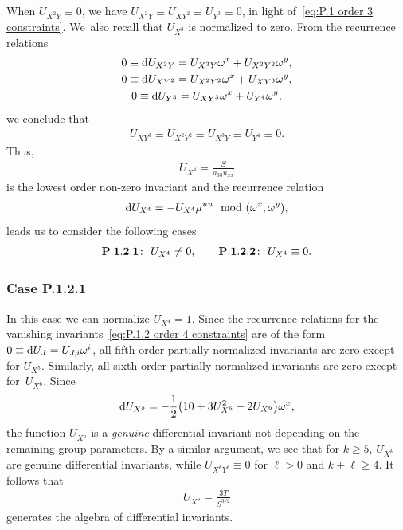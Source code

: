 \documentclass[10pt,a4paper]{amsart}
\numberwithin{equation}{section}
\begin{document}
When $U_{X^2Y}\equiv 0$, we have $U_{X^2Y}\equiv U_{XY^2}\equiv U_{Y^3}\equiv0$, in light of~\eqref{eq:P.1 order 3 constraints}. We~also recall that $U_{X^3}$ is normalized to zero. From the recurrence relations
%
\begin{gather*}
0 \equiv {\rm d}U_{X^2Y} = U_{X^3Y}\omega^x + U_{X^2Y^2}\omega^y, \\
0 \equiv {\rm d}U_{XY^2} = U_{X^2Y^2}\omega^x + U_{XY^3}\omega^y, \\
0 \equiv {\rm d}U_{Y^3} = U_{XY^3}\omega^x + U_{Y^4}\omega^y,
\end{gather*}
%
we conclude that
%
\begin{gather}\label{eq:P.1.2 order 4 constraints}
U_{XY^3} \equiv U_{X^2Y^2}\equiv U_{X^3Y}\equiv U_{Y^4} \equiv 0.
\end{gather}
%
Thus,
\begin{gather*}
U_{X^4} = \frac{S}{a_{33}u_{xx}}
\end{gather*}
is the lowest order non-zero invariant and the recurrence relation
\begin{gather*}
{\rm d}U_{X^4}= - U_{X^4}\mu^{uu} \mod (\omega^x,\omega^y),
\end{gather*}
leads us to consider the following cases
\begin{gather*}
{\bf P.1.2.1}\colon\ U_{X^4}\neq 0,\qquad
{\bf P.1.2.2}\colon\ U_{X^4}\equiv 0.
\end{gather*}

\subsubsection{Case P.1.2.1}

In this case we can normalize $U_{X^4}=1$. Since the recurrence relations for the vanishing invariants~\eqref{eq:P.1.2 order 4 constraints} are of the form $0\equiv {\rm d}U_J = U_{J,i}\omega^i$, all fifth order partially normalized invariants are zero except for $U_{X^5}$. Similarly, all sixth order partially normalized invariants are zero except for~$U_{X^6}$. Since
\begin{gather*}
{\rm d}U_{X^5}=-\frac{1}{2}\big(10+3U_{X^5}^2-2U_{X^6}\big) \omega^x,
\end{gather*}
the function $U_{X^5}$ is a \emph{genuine} differential invariant not depending on the remaining group parameters. By a similar argument, we see that for $k\geq 5$, $U_{X^k}$ are genuine differential invariants, while $U_{X^kY^\ell}\equiv 0$ for $\ell>0$ and $k+\ell \geq4$. It follows that
\begin{gather*}
U_{X^5}=\frac{3T}{S^{3/2}}
\end{gather*}
generates the algebra of differential invariants.
\end{document}
